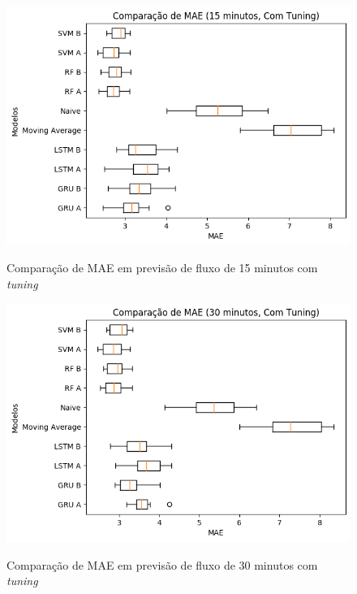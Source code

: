 \begin{figure}[htbp]
    \centering
    \includegraphics[scale=0.8]{monography/img/snapshots/comparacao_de_mae_(15_minutos,_com_tuning)_performance_boxes.png}
    \label{figure:comparacao_previsao_mae_15_com_tuning}
    \caption{Comparação de MAE em previsão de fluxo de 15 minutos com \textit{tuning}}
\end{figure}

\begin{figure}[htbp]
    \centering
    \includegraphics[scale=0.8]{monography/img/snapshots/comparacao_de_mae_(30_minutos,_com_tuning)_performance_boxes.png}
    \label{figure:comparacao_previsao_mae_30_com_tuning}
    \caption{Comparação de MAE em previsão de fluxo de 30 minutos com \textit{tuning}}
\end{figure}

